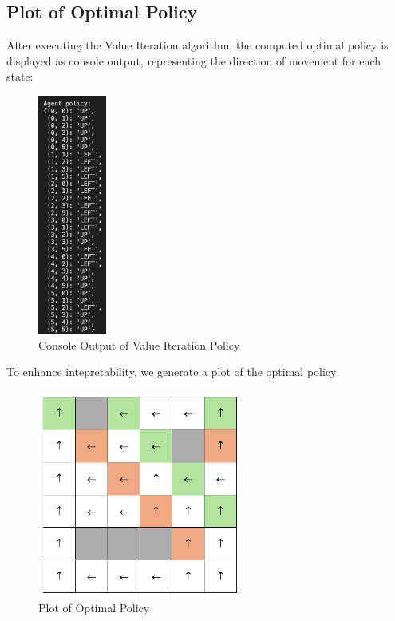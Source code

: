 \subsection{Plot of Optimal Policy}
After executing the Value Iteration algorithm, the computed optimal policy is displayed as console output, representing the direction of movement for each state:

\begin{figure}[H]
    \centering
    \includegraphics[width=0.2\textwidth]{images/vi_policy.png}
    \caption{Console Output of Value Iteration Policy}
\end{figure}

To enhance intepretability, we generate a plot of the optimal policy:

\begin{figure}[H]
    \centering
    \includegraphics[width=0.6\textwidth]{images/vi_plot_policy.png}
    \caption{Plot of Optimal Policy}
    \label{fig:vi_plot_policy}
\end{figure}

